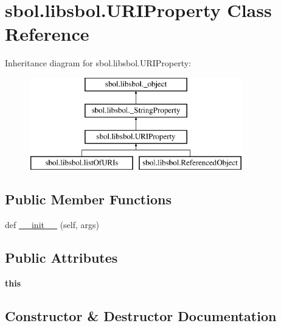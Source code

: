 \hypertarget{classsbol_1_1libsbol_1_1_u_r_i_property}{}\section{sbol.\+libsbol.\+U\+R\+I\+Property Class Reference}
\label{classsbol_1_1libsbol_1_1_u_r_i_property}
Inheritance diagram for sbol.\+libsbol.\+U\+R\+I\+Property\+:\begin{figure}[H]
\begin{center}
\leavevmode
\includegraphics[height=4.000000cm]{classsbol_1_1libsbol_1_1_u_r_i_property}
\end{center}
\end{figure}
\subsection*{Public Member Functions}
\begin{DoxyCompactItemize}
\item 
def \hyperlink{classsbol_1_1libsbol_1_1_u_r_i_property_ac74389dcf4419cd76c4a7f2fa3f4ee7f}{\+\_\+\+\_\+init\+\_\+\+\_\+} (self, args)
\end{DoxyCompactItemize}
\subsection*{Public Attributes}
\begin{DoxyCompactItemize}
\item 
{\bfseries this}\hypertarget{classsbol_1_1libsbol_1_1_u_r_i_property_a2dc05b14c5f5f113ca2a43dd612a43a4}{}\label{classsbol_1_1libsbol_1_1_u_r_i_property_a2dc05b14c5f5f113ca2a43dd612a43a4}

\end{DoxyCompactItemize}


\subsection{Constructor \& Destructor Documentation}

